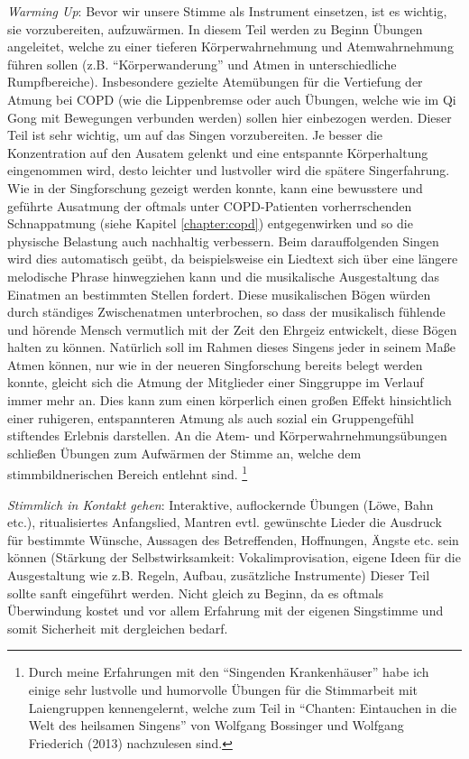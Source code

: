 \emph{Warming Up}: 
Bevor wir unsere Stimme als Instrument einsetzen, ist es wichtig, sie vorzubereiten, aufzuwärmen. In diesem Teil werden zu Beginn Übungen angeleitet, welche zu einer tieferen Körperwahrnehmung und Atemwahrnehmung führen sollen (z.B. "`Körperwanderung"' und Atmen in unterschiedliche Rumpfbereiche). Insbesondere gezielte Atemübungen für die Vertiefung der Atmung bei COPD (wie die Lippenbremse oder auch Übungen, welche wie im Qi Gong mit Bewegungen verbunden werden) sollen hier einbezogen werden. Dieser Teil ist sehr wichtig, um auf das Singen vorzubereiten. Je besser die Konzentration auf den Ausatem gelenkt und eine entspannte Körperhaltung eingenommen wird, desto leichter und lustvoller wird die spätere Singerfahrung. Wie in der Singforschung gezeigt werden konnte, kann eine bewusstere und geführte Ausatmung der oftmals unter COPD-Patienten vorherrschenden Schnappatmung (siehe Kapitel \ref{chapter:copd}) entgegenwirken und so die physische Belastung auch nachhaltig verbessern. Beim darauffolgenden Singen wird dies automatisch geübt, da beispielsweise ein Liedtext sich über eine längere melodische Phrase hinwegziehen kann und die musikalische Ausgestaltung das Einatmen an bestimmten Stellen fordert. Diese musikalischen Bögen würden durch ständiges Zwischenatmen unterbrochen, so dass der musikalisch fühlende und hörende Mensch vermutlich mit der Zeit den Ehrgeiz entwickelt, diese Bögen halten zu können. Natürlich soll im Rahmen dieses Singens jeder in seinem Maße Atmen können, nur wie in der neueren Singforschung bereits belegt werden konnte, gleicht sich die Atmung der Mitglieder einer Singgruppe im Verlauf immer mehr an. Dies kann zum einen körperlich einen großen Effekt hinsichtlich einer ruhigeren, entspannteren Atmung als auch sozial ein Gruppengefühl stiftendes Erlebnis darstellen. An die Atem- und Körperwahrnehmungsübungen schließen Übungen zum Aufwärmen der Stimme an, welche dem stimmbildnerischen Bereich entlehnt sind. \footnote{Durch meine Erfahrungen mit den "`Singenden Krankenhäuser"' habe ich einige sehr lustvolle und humorvolle Übungen für die Stimmarbeit mit Laiengruppen kennengelernt, welche zum Teil in "`Chanten: Eintauchen in die Welt des heilsamen Singens"' von Wolfgang Bossinger und Wolfgang Friederich (2013) nachzulesen sind.}

\emph{Stimmlich in Kontakt gehen}: 
Interaktive, auflockernde Übungen (Löwe, Bahn etc.), ritualisiertes Anfangslied, Mantren evtl. gewünschte Lieder die Ausdruck für bestimmte Wünsche, Aussagen des Betreffenden, Hoffnungen, Ängste etc. sein können
(Stärkung der Selbstwirksamkeit: Vokalimprovisation, eigene Ideen für die Ausgestaltung wie z.B. Regeln, Aufbau, zusätzliche Instrumente) Dieser Teil sollte sanft eingeführt werden. Nicht gleich zu Beginn, da es oftmals Überwindung kostet und vor allem Erfahrung mit der eigenen Singstimme und somit Sicherheit mit dergleichen bedarf.

